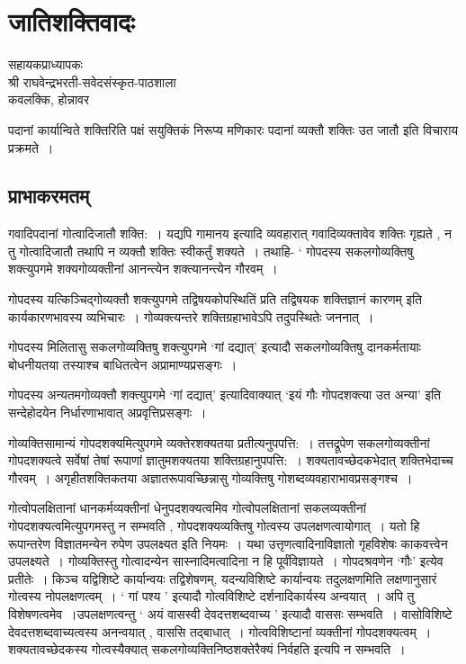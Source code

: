 {\fontsize{15}{17}\selectfont
\presetvalues
{}
\chapter{जातिशक्तिवादः}


\begin{center}
\smallskip

सहायकप्राध्यापकः\\
श्री राघवेन्द्रभरती-सवेदसंस्कृत-पाठशाला\\
कवलक्कि, होन्नावर
\addrule
\end{center}

पदानां कार्यान्विते शक्तिरिति पक्षं सयुक्तिकं निरूप्य मणिकारः पदानां व्यक्तौ शक्तिः उत जातौ इति विचाराय प्रक्रमते~। 

\section*{प्राभाकरमतम्}

गवादिपदानां गोत्वादिजातौ शक्ति:~। यद्यपि गामानय इत्यादि व्यवहारात् गवादिव्यक्तावेव शक्तिः गृह्यते , न तु गोत्वादिजातौ तथापि न व्यक्तौ शक्तिः स्वीकर्तुं शक्यते~। तथाहि- ‘ गोपदस्य सकलगोव्यक्तिषु शक्त्युपगमे शक्यगोव्यक्तीनां आनन्त्येन शक्त्यानन्त्येन गौरवम्~। 

गोपदस्य यत्किञ्चिद्गोव्यक्तौ शक्त्युपगमे तद्विषयकोपस्थितिं प्रति तद्विषयक शक्तिज्ञानं कारणम् इति कार्यकारणभावस्य व्यभिचारः~। गोव्यक्त्यन्तरे शक्तिग्रहाभावेऽपि तदुपस्थितेः जननात्~। 

गोपदस्य मिलितासु सकलगोव्यक्तिषु शक्त्युपगमे ‘गां दद्यात्’ इत्यादौ सकलगोव्यक्तिषु दानकर्मतायाः बोधनीयतया तस्याश्च बाधितत्वेन अप्रामाण्यप्रसङ्गः~। 

गोपदस्य अन्यतमगोव्यक्तौ शक्त्युपगमे ‘गां दद्यात्’ इत्यादिवाक्यात् ‘इयं गौः गोपदशक्त्या उत अन्या’ इति सन्देहोदयेन निर्धारणाभावात् अप्रवृत्तिप्रसङ्गः~। 

गोव्यक्तिसामान्यं गोपदशक्यमित्युपगमे व्यक्तेरशक्यतया प्रतीत्यनुपपत्ति:~। तत्तद्रूपेण सकलगोव्यक्तीनां गोपदशक्यत्वे सर्वेषां तेषां रूपाणां ज्ञातुमशक्यतया शक्तिग्रहानुपपत्ति:~। शक्यतावच्छेदकभेदात् शक्तिभेदाच्च गौरवम्~। अगृहीतशक्तिकतया अज्ञातरूपावच्छिन्नासु गोव्यक्तिषु गोशब्दव्यवहाराभावप्रसङ्गश्च~। 

गोत्वोपलक्षितानां धानकर्मव्यक्तीनां धेनुपदशक्यत्वमिव गोत्वोपलक्षितानां सकल\-व्यक्तीनां गोपदशक्यत्वमित्युपगमस्तु न सम्भवति , गोपदशक्यव्यक्तिषु गोत्वस्य उपलक्षणत्वायोगात्~। यतो हि रूपान्तरेण विज्ञातमन्येन रुपेण उपलक्ष्यत इति नियमः~। यथा उत्तृणत्वादिना\break विज्ञातो गृहविशेषः काकवत्त्वेन उपलक्ष्यते~। गोव्यक्तिस्तु गोत्वादन्येन सास्नादिमत्वादिना न हि पूर्वंविज्ञायते~। गोपदश्रवणेन ‘गौः’ इत्येव प्रतीतेः~। किञ्च यद्विशिष्टे कार्यान्वयः तद्विशेषणम्, यदन्यविशिष्टे कार्यान्वयः तदुलक्षणमिति लक्षणानुसारं गोत्वस्य नोपलक्षणत्वम्~। ‘ गां पश्य ’ इत्यादौ गोत्वविशिष्टे दर्शनादिकार्यस्य अन्वयात्~। अपि तु विशेषणत्वमेव~।\break उपलक्षणत्वन्तु ‘ अयं वासस्वी देवदत्तशब्दवाच्य ’ इत्यादौ वाससः सम्भवति~। वासोविशिष्टे देवदत्तशब्दवाच्यत्वस्य अनन्वयात् , वाससि तद्बाधात्~। गोत्वविशिष्टानां व्यक्तीनां गोपदशक्यत्वम्~। शक्यतावच्छेदकस्य गोत्वस्यैक्यात् सकलगोव्यक्तिनिष्ठशक्तेरैक्यं निर्वहति इत्यपि न सम्भवति~। 

}
